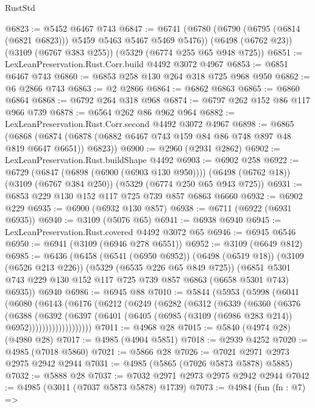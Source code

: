 \begin{lexlean}{RustStd}
\begin{coremodule}
@6823 := @5452 @6467 @743
@6847 := @6741
    (@6780 (@6790 (@6795 (@6814 (@6821 @6823))) @5459 @5463 @5467 @5469 @5476))
    (@6498 (@6762 @23))
    (@3109 (@6767 @383 @255))
    (@5329 (@6774 @255 @65 @948 @725))
@6851 := LexLeanPreservation.Rust.Corr.build @4492 @3072 @4967
@6853 := @6851 @6467 @743
@6860 := @6853 @258 @130 @264 @318 @725 @968 @950
@6862 := @6 @2866 @743
@6863 := @2 @2866
@6864 := @6862 @6863
@6865 := @6860 @6864
@6868 := @6792 @264 @318 @968
@6874 := @6797 @262 @152 @86 @117 @966 @739
@6878 := @6564 @262 @86 @962 @964
@6882 := LexLeanPreservation.Rust.Corr.second @4492 @3072 @4967
@6898 := @6865
    (@6868 (@6874 (@6878 (@6882 @6467 @743 @159 @84 @86 @748 @897 @48 @819 @6647 @6651)) @6823))
@6900 := @2960 (@2931 @2862)
@6902 := LexLeanPreservation.Rust.buildShape @4492
@6903 := @6902 @258
@6922 := @6729
    (@6847 (@6898 (@6900 (@6903 @130 @950))))
    (@6498 (@6762 @18))
    (@3109 (@6767 @384 @250))
    (@5329 (@6774 @250 @65 @943 @725))
@6931 := @6853 @229 @130 @152 @117 @725 @739 @857 @6863 @6660
@6932 := @6902 @229
@6935 := @6900 (@6932 @130 @857)
@6938 := @6711 (@6922 (@6931 @6935))
@6940 := @3109 (@5076 @65)
@6941 := @6938 @6940
@6945 := LexLeanPreservation.Rust.covered @4492 @3072 @65
@6946 := @6945 @6546
@6950 := @6941 (@3109 (@6946 @278 @6551))
@6952 := @3109 (@6649 @812)
@6985 := @6436
    (@6458
      (@6541 (@6950 @6952))
      (@6498 (@6519 @18))
      (@3109 (@6526 @213 @226))
      (@5329 (@6535 @226 @65 @849 @725))
      (@6851 @5301 @743 @229 @130 @152 @117 @725 @739 @857 @6863 (@6658 @5301 @743) @6935))
    @6940
@6986 := @6945 @88
@7010 := @5844
    (@5953
      (@5998
        (@6041
          (@6080
            (@6143
              (@6176
                (@6212
                  (@6249
                    (@6282
                      (@6312
                        (@6339
                          (@6360
                            (@6376
                              (@6388
                                (@6392
                                  (@6397
                                    (@6401
                                      (@6405
                                        (@6985 (@3109 (@6986 @283 @214)) @6952)))))))))))))))))))
@7011 := @4968 @28
@7015 := @5840 (@4974 @28) (@4980 @28)
@7017 := @4985 (@4904 @5851)
@7018 := @2939 @4252
@7020 := @4985 (@7018 @5860)
@7021 := @5866 @28
@7026 := @7021 @2971 @2973 @2975 @2942 @2944
@7031 := @4985 (@5865 (@7026 @5873 @5878) @5885)
@7032 := @5888 @28
@7037 := @7032 @2971 @2973 @2975 @2942 @2944
@7042 := @4985 (@3011 (@7037 @5873 @5878) @1739)
@7073 := @4984
    (fun (fn : @7) =>

\end{coremodule}
\end{lexlean}
